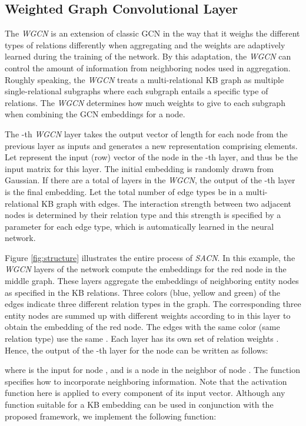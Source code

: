 \documentclass[letterpaper]{article} \usepackage{aaai19}  \usepackage{times}  \usepackage{helvet}  \usepackage{courier}  \usepackage{url}  \usepackage{graphicx}  \usepackage{amsmath}
\begin{document}
\subsection{Weighted Graph Convolutional Layer}
The {\it WGCN} is an extension of classic GCN \cite{kipf2016semi} in the way that it weighs the different types of relations differently when aggregating and the weights are adaptively learned during the training of the network. By this adaptation, the {\it WGCN} can control the amount of information from neighboring nodes used in aggregation. Roughly speaking, the {\it WGCN} treats a multi-relational KB graph as multiple single-relational subgraphs where each subgraph entails a specific type of relations. The {\it WGCN} determines how much weights to give to each subgraph when combining the GCN embeddings for a node. 

The -th {\it WGCN} layer takes the output vector of length  for each node from the previous layer as inputs and generates a new representation comprising  elements. Let  represent the input (row) vector of the node  in the -th layer, and thus  be the input matrix for this layer. The initial embedding  is randomly drawn from Gaussian. If there are a total of  layers in the {\it WGCN}, the output  of the -th layer is the final embedding.
Let the total number of edge types be  in a multi-relational KB graph with  edges.
The interaction strength between two adjacent nodes is determined by their relation type and this strength is specified by a parameter  for each edge type, which is automatically learned in the neural network. 

Figure \ref{fig:structure} illustrates the entire process of {\it SACN}. In this example, the {\it WGCN} layers of the network compute the embeddings for the red node in the middle graph. These layers aggregate the embeddings of neighboring entity nodes as specified in the KB relations. Three colors (blue, yellow and green) of the edges indicate three different relation types in the graph. The corresponding three entity nodes are summed up with different weights according to  in this layer to obtain the embedding of the red node. The edges with the same color (same relation type) use the same . Each layer has its own set of relation weights . Hence, the output of the -th layer for the node   can be written as follows:

where  is the input for node , and  is a node in the neighbor  of node . The  function specifies how to incorporate neighboring information. Note that the activation function  here is applied to every component of its input vector. 
Although any function  suitable for a KB embedding can be used in conjunction with the proposed framework, we implement the following  function:
\end{document}
